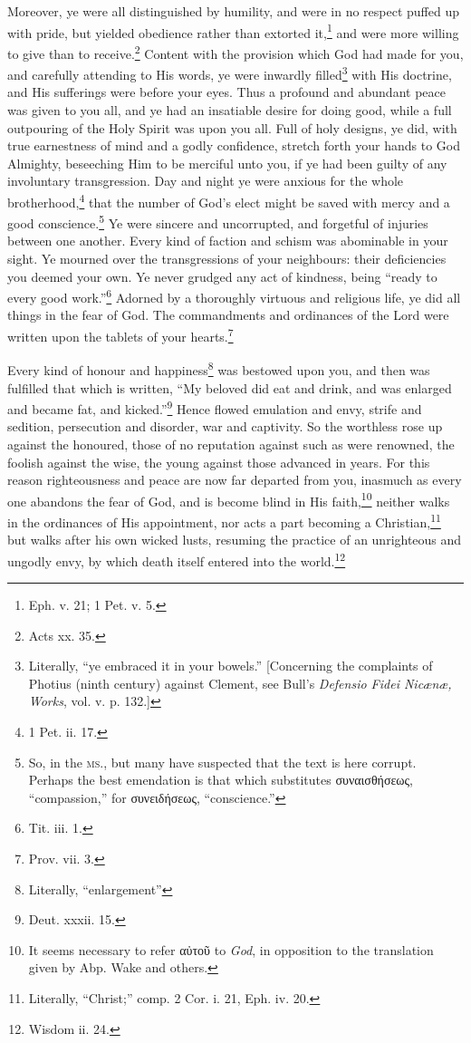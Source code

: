 Moreover, ye were all distinguished by humility, and were in no respect puffed up with pride, but yielded obedience rather than extorted it,\footnote{Eph. v. 21; 1 Pet. v. 5.} and were more willing to give than to receive.\footnote{Acts xx. 35.} Content with the provision which God had made for you, and carefully attending to His words, ye were inwardly filled\footnote{Literally, “ye embraced it in your bowels.” [Concerning the complaints of Photius (ninth century) against Clement, see Bull’s \emph{Defensio Fidei Nicænæ, Works}, vol. v. p. 132.]} with His doctrine, and His sufferings were before your eyes. Thus a profound and abundant peace was given to you all, and ye had an insatiable desire for doing good, while a full outpouring of the Holy Spirit was upon you all. Full of holy designs, ye did, with true earnestness of mind and a godly confidence, stretch forth your hands to God Almighty, beseeching Him to be merciful unto you, if ye had been guilty of any involuntary transgression. Day and night ye were anxious for the whole brotherhood,\footnote{1 Pet. ii. 17.} that the number of God’s elect might be saved with mercy and a good conscience.\footnote{So, in the \textsc{ms.}, but many have suspected that the text is here corrupt. Perhaps the best emendation is that which substitutes \textgreek{συναισθήσεως}, “compassion,” for \textgreek{συνειδήσεως}, “conscience.”} Ye were sincere and uncorrupted, and forgetful of injuries between one another. Every kind of faction and schism was abominable in your sight. Ye mourned over the transgressions of your neighbours: their deficiencies you deemed your own. Ye never grudged any act of kindness, being “ready to every good work.”\footnote{Tit. iii. 1.} Adorned by a thoroughly virtuous and religious life, ye did all things in the fear of God. The commandments and ordinances of the Lord were written upon the tablets of your hearts.\footnote{Prov. vii. 3.}


Every kind of honour and happiness\footnote{Literally, “enlargement”} was bestowed upon you, and then was fulfilled that which is written, “My beloved did eat and drink, and was enlarged and became fat, and kicked.”\footnote{Deut. xxxii. 15.} Hence flowed emulation and envy, strife and sedition, persecution and disorder, war and captivity. So the worthless rose up against the honoured, those of no reputation  against such as were renowned, the foolish against the wise, the young against those advanced in years. For this reason righteousness and peace are now far departed from you, inasmuch as every one abandons the fear of God, and is become blind in His faith,\footnote{It seems necessary to refer \textgreek{αὐτοῦ} to \emph{God}, in opposition to the translation given by Abp. Wake and others.} neither walks in the ordinances of His appointment, nor acts a part becoming a Christian,\footnote{Literally, “Christ;” comp. 2 Cor. i. 21, Eph. iv. 20.} but walks after his own wicked lusts, resuming the practice of an unrighteous and ungodly envy, by which death itself entered into the world.\footnote{Wisdom ii. 24.}

